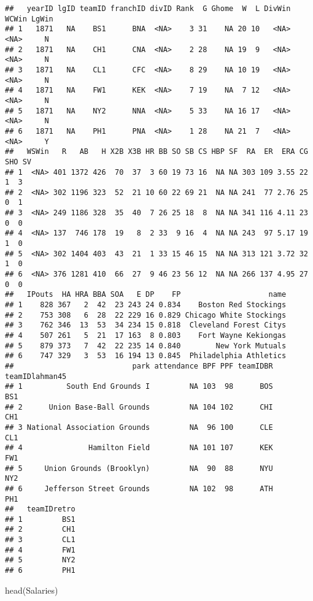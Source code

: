 \documentclass[
]{article}
\newenvironment{Shaded}{\begin{snugshade}}{\end{snugshade}}
\newcommand{\FunctionTok}[1]{\textcolor[rgb]{0.00,0.00,0.00}{#1}}
\newcommand{\NormalTok}[1]{#1}
\begin{document}
\begin{verbatim}
##   yearID lgID teamID franchID divID Rank  G Ghome  W  L DivWin WCWin LgWin
## 1   1871   NA    BS1      BNA  <NA>    3 31    NA 20 10   <NA>  <NA>     N
## 2   1871   NA    CH1      CNA  <NA>    2 28    NA 19  9   <NA>  <NA>     N
## 3   1871   NA    CL1      CFC  <NA>    8 29    NA 10 19   <NA>  <NA>     N
## 4   1871   NA    FW1      KEK  <NA>    7 19    NA  7 12   <NA>  <NA>     N
## 5   1871   NA    NY2      NNA  <NA>    5 33    NA 16 17   <NA>  <NA>     N
## 6   1871   NA    PH1      PNA  <NA>    1 28    NA 21  7   <NA>  <NA>     Y
##   WSWin   R   AB   H X2B X3B HR BB SO SB CS HBP SF  RA  ER  ERA CG SHO SV
## 1  <NA> 401 1372 426  70  37  3 60 19 73 16  NA NA 303 109 3.55 22   1  3
## 2  <NA> 302 1196 323  52  21 10 60 22 69 21  NA NA 241  77 2.76 25   0  1
## 3  <NA> 249 1186 328  35  40  7 26 25 18  8  NA NA 341 116 4.11 23   0  0
## 4  <NA> 137  746 178  19   8  2 33  9 16  4  NA NA 243  97 5.17 19   1  0
## 5  <NA> 302 1404 403  43  21  1 33 15 46 15  NA NA 313 121 3.72 32   1  0
## 6  <NA> 376 1281 410  66  27  9 46 23 56 12  NA NA 266 137 4.95 27   0  0
##   IPouts  HA HRA BBA SOA   E DP    FP                    name
## 1    828 367   2  42  23 243 24 0.834    Boston Red Stockings
## 2    753 308   6  28  22 229 16 0.829 Chicago White Stockings
## 3    762 346  13  53  34 234 15 0.818  Cleveland Forest Citys
## 4    507 261   5  21  17 163  8 0.803    Fort Wayne Kekiongas
## 5    879 373   7  42  22 235 14 0.840        New York Mutuals
## 6    747 329   3  53  16 194 13 0.845  Philadelphia Athletics
##                           park attendance BPF PPF teamIDBR teamIDlahman45
## 1          South End Grounds I         NA 103  98      BOS            BS1
## 2      Union Base-Ball Grounds         NA 104 102      CHI            CH1
## 3 National Association Grounds         NA  96 100      CLE            CL1
## 4               Hamilton Field         NA 101 107      KEK            FW1
## 5     Union Grounds (Brooklyn)         NA  90  88      NYU            NY2
## 6     Jefferson Street Grounds         NA 102  98      ATH            PH1
##   teamIDretro
## 1         BS1
## 2         CH1
## 3         CL1
## 4         FW1
## 5         NY2
## 6         PH1
\end{verbatim}

\begin{Shaded}
\begin{Highlighting}[]
\FunctionTok{head}\NormalTok{(Salaries)}
\end{Highlighting}
\end{Shaded}
\end{document}
